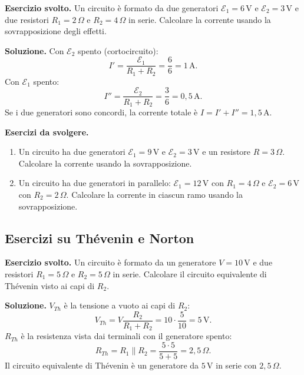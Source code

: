 \begin{esercizio}
\textbf{Esercizio svolto.} Un circuito è formato da due generatori \(\mathcal{E}_1 = 6\,\text{V}\) e \(\mathcal{E}_2 = 3\,\text{V}\) e due resistori \(R_1 = 2\,\Omega\) e \(R_2 = 4\,\Omega\) in serie. Calcolare la corrente usando la sovrapposizione degli effetti.

\smallskip
\textbf{Soluzione.} Con \(\mathcal{E}_2\) spento (cortocircuito):
\[
I' = \frac{\mathcal{E}_1}{R_1 + R_2} = \frac{6}{6} = 1\,\text{A}.
\]
Con \(\mathcal{E}_1\) spento:
\[
I'' = \frac{\mathcal{E}_2}{R_1 + R_2} = \frac{3}{6} = 0{,}5\,\text{A}.
\]
Se i due generatori sono concordi, la corrente totale è \(I = I' + I'' = 1{,}5\,\text{A}\).
\end{esercizio}

\textbf{Esercizi da svolgere.}
\begin{enumerate}[leftmargin=1cm]
  \item Un circuito ha due generatori \(\mathcal{E}_1 = 9\,\text{V}\) e \(\mathcal{E}_2 = 3\,\text{V}\) e un resistore \(R = 3\,\Omega\). Calcolare la corrente usando la sovrapposizione.
  \item Un circuito ha due generatori in parallelo: \(\mathcal{E}_1 = 12\,\text{V}\) con \(R_1 = 4\,\Omega\) e \(\mathcal{E}_2 = 6\,\text{V}\) con \(R_2 = 2\,\Omega\). Calcolare la corrente in ciascun ramo usando la sovrapposizione.
\end{enumerate}

\subsection{Esercizi su Thévenin e Norton}

\begin{esercizio}
\textbf{Esercizio svolto.} Un circuito è formato da un generatore \(V = 10\,\text{V}\) e due resistori \(R_1 = 5\,\Omega\) e \(R_2 = 5\,\Omega\) in serie. Calcolare il circuito equivalente di Thévenin visto ai capi di \(R_2\).

\smallskip
\textbf{Soluzione.} \(V_{Th}\) è la tensione a vuoto ai capi di \(R_2\):
\[
V_{Th} = V \frac{R_2}{R_1 + R_2} = 10 \cdot \frac{5}{10} = 5\,\text{V}.
\]
\(R_{Th}\) è la resistenza vista dai terminali con il generatore spento:
\[
R_{Th} = R_1 \parallel R_2 = \frac{5 \cdot 5}{5+5} = 2{,}5\,\Omega.
\]
Il circuito equivalente di Thévenin è un generatore da \(5\,\text{V}\) in serie con \(2{,}5\,\Omega\).
\end{esercizio}

